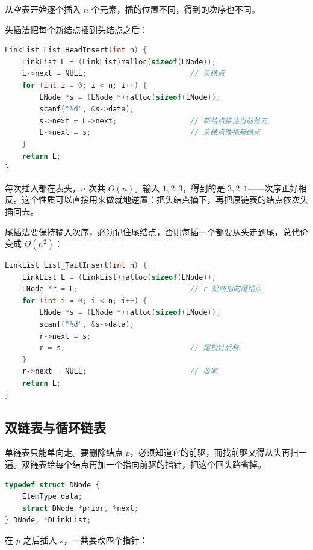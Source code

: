 从空表开始逐个插入 $n$ 个元素，插的位置不同，得到的次序也不同。

头插法把每个新结点插到头结点之后：

\begin{lstlisting}[language=C]
LinkList List_HeadInsert(int n) {
    LinkList L = (LinkList)malloc(sizeof(LNode));
    L->next = NULL;                        // 头结点
    for (int i = 0; i < n; i++) {
        LNode *s = (LNode *)malloc(sizeof(LNode));
        scanf("%d", &s->data);
        s->next = L->next;                 // 新结点接住当前首元
        L->next = s;                       // 头结点改指新结点
    }
    return L;
}
\end{lstlisting}

每次插入都在表头，$n$ 次共 $O(n)$。输入 $1,2,3$，得到的是 $3,2,1$——次序正好相反。这个性质可以直接用来做就地逆置：把头结点摘下，再把原链表的结点依次头插回去。

尾插法要保持输入次序，必须记住尾结点，否则每插一个都要从头走到尾，总代价变成 $O(n^2)$：

\begin{lstlisting}[language=C]
LinkList List_TailInsert(int n) {
    LinkList L = (LinkList)malloc(sizeof(LNode));
    LNode *r = L;                          // r 始终指向尾结点
    for (int i = 0; i < n; i++) {
        LNode *s = (LNode *)malloc(sizeof(LNode));
        scanf("%d", &s->data);
        r->next = s;
        r = s;                             // 尾指针后移
    }
    r->next = NULL;                        // 收尾
    return L;
}
\end{lstlisting}

\subsection{双链表与循环链表}

单链表只能单向走。要删除结点 $p$，必须知道它的前驱，而找前驱又得从头再扫一遍。双链表给每个结点再加一个指向前驱的指针，把这个回头路省掉。

\begin{lstlisting}[language=C]
typedef struct DNode {
    ElemType data;
    struct DNode *prior, *next;
} DNode, *DLinkList;
\end{lstlisting}

在 $p$ 之后插入 $s$，一共要改四个指针：

